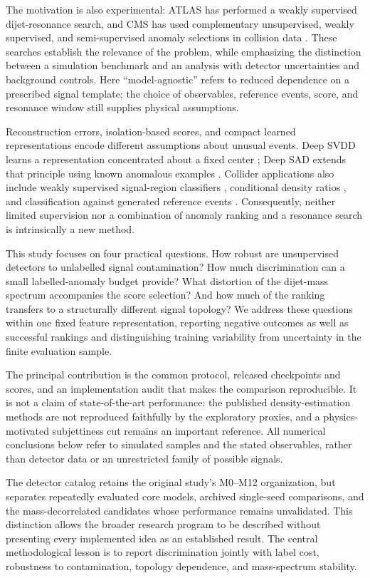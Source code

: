 \documentclass[reprint,aps,pra,amsmath,amssymb,floatfix,raggedbottom]{revtex4-2}
\begin{document}
The motivation is also experimental: ATLAS has performed a weakly supervised dijet-resonance search, and CMS has used complementary unsupervised, weakly supervised, and semi-supervised anomaly selections in collision data \cite{atlas,cms}. These searches establish the relevance of the problem, while emphasizing the distinction between a simulation benchmark and an analysis with detector uncertainties and background controls. Here ``model-agnostic'' refers to reduced dependence on a prescribed signal template; the choice of observables, reference events, score, and resonance window still supplies physical assumptions.

Reconstruction errors, isolation-based scores, and compact learned representations encode different assumptions about unusual events. Deep SVDD learns a representation concentrated about a fixed center \cite{svdd}; Deep SAD extends that principle using known anomalous examples \cite{sad}. Collider applications also include weakly supervised signal-region classifiers \cite{cwola}, conditional density ratios \cite{anode}, and classification against generated reference events \cite{cathode}. Consequently, neither limited supervision nor a combination of anomaly ranking and a resonance search is intrinsically a new method.

This study focuses on four practical questions. How robust are unsupervised detectors to unlabelled signal contamination? How much discrimination can a small labelled-anomaly budget provide? What distortion of the dijet-mass spectrum accompanies the score selection? And how much of the ranking transfers to a structurally different signal topology? We address these questions within one fixed feature representation, reporting negative outcomes as well as successful rankings and distinguishing training variability from uncertainty in the finite evaluation sample.

The principal contribution is the common protocol, released checkpoints and scores, and an implementation audit that makes the comparison reproducible. It is not a claim of state-of-the-art performance: the published density-estimation methods are not reproduced faithfully by the exploratory proxies, and a physics-motivated subjettiness cut remains an important reference. All numerical conclusions below refer to simulated samples and the stated observables, rather than detector data or an unrestricted family of possible signals.

The detector catalog retains the original study's M0--M12 organization, but separates repeatedly evaluated core models, archived single-seed comparisons, and the mass-decorrelated candidates whose performance remains unvalidated. This distinction allows the broader research program to be described without presenting every implemented idea as an established result. The central methodological lesson is to report discrimination jointly with label cost, robustness to contamination, topology dependence, and mass-spectrum stability.
\end{document}
